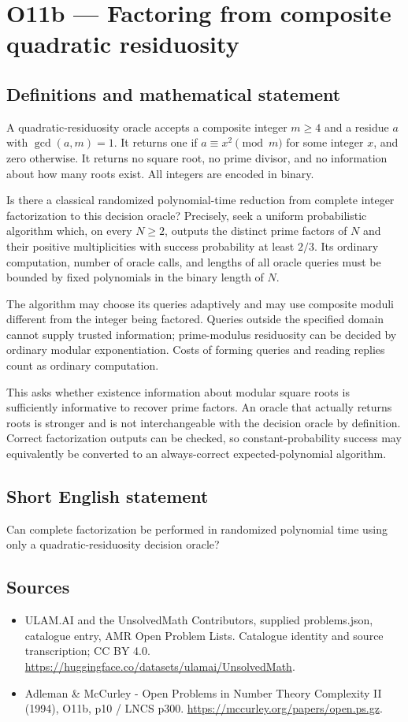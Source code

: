 \documentclass[11pt,a4paper]{article}
\begin{document}
\section*{O11b — Factoring from composite quadratic residuosity}\label{statement}

\subsection{Definitions and mathematical statement}
A quadratic-residuosity oracle accepts a composite integer $m\ge4$ and a residue $a$ with $\gcd(a,m)=1$. It returns one if $a\equiv x^2\pmod m$ for some integer $x$, and zero otherwise. It returns no square root, no prime divisor, and no information about how many roots exist. All integers are encoded in binary.

Is there a classical randomized polynomial-time reduction from complete integer factorization to this decision oracle? Precisely, seek a uniform probabilistic algorithm which, on every $N\ge2$, outputs the distinct prime factors of $N$ and their positive multiplicities with success probability at least $2/3$. Its ordinary computation, number of oracle calls, and lengths of all oracle queries must be bounded by fixed polynomials in the binary length of $N$.

The algorithm may choose its queries adaptively and may use composite moduli different from the integer being factored. Queries outside the specified domain cannot supply trusted information; prime-modulus residuosity can be decided by ordinary modular exponentiation. Costs of forming queries and reading replies count as ordinary computation.

This asks whether existence information about modular square roots is sufficiently informative to recover prime factors. An oracle that actually returns roots is stronger and is not interchangeable with the decision oracle by definition. Correct factorization outputs can be checked, so constant-probability success may equivalently be converted to an always-correct expected-polynomial algorithm.
\subsection{Short English statement}
Can complete factorization be performed in randomized polynomial time using only a quadratic-residuosity decision oracle?
\subsection{Sources}
\begin{itemize}
\item[S1] ULAM.AI and the UnsolvedMath Contributors, supplied problems.json, catalogue entry, AMR Open Problem Lists. Catalogue identity and source transcription; CC BY 4.0.
\url{https://huggingface.co/datasets/ulamai/UnsolvedMath}.
\item[S2] Adleman \& McCurley - Open Problems in Number Theory Complexity II (1994), O11b, p10 / LNCS p300. 
\url{https://mccurley.org/papers/open.ps.gz}.
\end{itemize}
\end{document}
